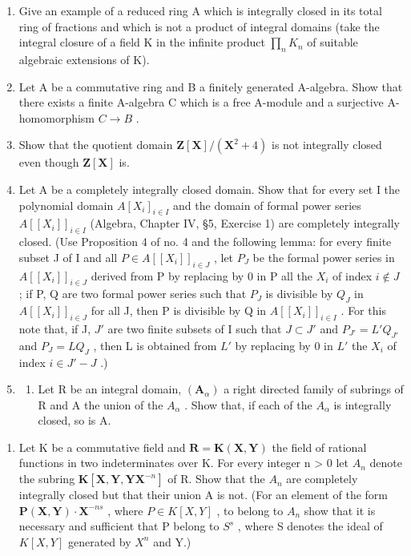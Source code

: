 \begin{enumerate}
\item
  Give an example of a reduced ring A which is integrally closed in its total ring of fractions and which is not a product of integral domains (take the integral closure of a field K in the infinite product \(\prod_{n} K_{n}\) of suitable algebraic extensions of K).
\item
  Let A be a commutative ring and B a finitely generated A-algebra. Show that there exists a finite A-algebra C which is a free A-module and a surjective A-homomorphism \(C \rightarrow B\) .
\item
  Show that the quotient domain \(\mathbf{Z}[\mathbf{X}] / (\mathbf{X}^2 +4)\) is not integrally closed even though \(\mathbf{Z}[\mathbf{X}]\) is.
\item
  Let A be a completely integrally closed domain. Show that for every set I the polynomial domain \(A[X_{i}]_{i \in I}\) and the domain of formal power series \(A[[X_{i}]]_{i \in I}\) (Algebra, Chapter IV, §5, Exercise 1) are completely integrally closed. (Use Proposition 4 of no. 4 and the following lemma: for every finite subset J of I and all \(P \in A[[X_{i}]]_{i \in J}\) , let \(P_{J}\) be the formal power series in \(A[[X_{i}]]_{i \in J}\) derived from P by replacing by 0 in P all the \(X_{i}\) of index \(i \notin J\) ; if P, Q are two formal power series such that \(P_{J}\) is divisible by \(Q_{J}\) in \(A[[X_{i}]]_{i \in J}\) for all J, then P is divisible by Q in \(A[[X_{i}]]_{i \in I}\) . For this note that, if J, \(J'\) are two finite subsets of I such that \(J \subset J'\) and \(P_{J'} = L'Q_{J'}\) and \(P_{J} = LQ_{J}\) , then L is obtained from \(L'\) by replacing by 0 in \(L'\) the \(X_{i}\) of index \(i \in J' - J\) .)
\item
  \begin{enumerate}
  \def\labelenumii{(\alph{enumii})}
  \tightlist
  \item
    Let R be an integral domain, \((\mathbf{A}_{\alpha})\) a right directed family of subrings of R and A the union of the \(A_{\alpha}\) . Show that, if each of the \(A_{\alpha}\) is integrally closed, so is A.
  \end{enumerate}
\end{enumerate}

\begin{enumerate}
\def\labelenumi{(\alph{enumi})}
\setcounter{enumi}{1}
\tightlist
\item
  Let K be a commutative field and \(\mathbf{R} = \mathbf{K}(\mathbf{X}, \mathbf{Y})\) the field of rational functions in two indeterminates over K. For every integer n \textgreater{} 0 let \(A_{n}\) denote the subring \(\mathbf{K}[\mathbf{X}, \mathbf{Y}, \mathbf{Y}\mathbf{X}^{-n}]\) of R. Show that the \(A_{n}\) are completely integrally closed but that their union A is not. (For an element of the form \(\mathbf{P}(\mathbf{X}, \mathbf{Y}) \cdot \mathbf{X}^{-ns}\) , where \(P \in K[X, Y]\) , to belong to \(A_{n}\) show that it is necessary and sufficient that P belong to \(S^{s}\) , where S denotes the ideal of \(K[X, Y]\) generated by \(X^{n}\) and Y.)
\end{enumerate}

